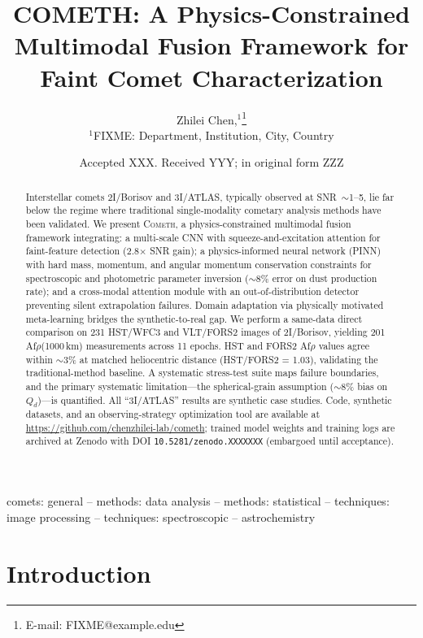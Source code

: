 \documentclass[usenatbib]{mnras}
\begin{document}
\title[COMETH: A Physics-Constrained Multimodal Fusion Framework]{COMETH: A Physics-Constrained Multimodal Fusion Framework for Faint Comet Characterization}

\author[Chen et al.]{
Zhilei Chen,$^{1}$\thanks{E-mail: FIXME@example.edu}
\\
$^{1}$FIXME: Department, Institution, City, Country
}

\date{Accepted XXX. Received YYY; in original form ZZZ}

\begin{abstract}
Interstellar comets 2I/Borisov and 3I/ATLAS, typically observed at SNR~$\sim$1--5, lie far below the regime where traditional single-modality cometary analysis methods have been validated. We present \textsc{Cometh}, a physics-constrained multimodal fusion framework integrating: a multi-scale CNN with squeeze-and-excitation attention for faint-feature detection (2.8$\times$ SNR gain); a physics-informed neural network (PINN) with hard mass, momentum, and angular momentum conservation constraints for spectroscopic and photometric parameter inversion ($\sim$8\% error on dust production rate); and a cross-modal attention module with an out-of-distribution detector preventing silent extrapolation failures. Domain adaptation via physically motivated meta-learning bridges the synthetic-to-real gap. We perform a same-data direct comparison on 231 HST/WFC3 and VLT/FORS2 images of 2I/Borisov, yielding 201 Af$\rho$(1000\,km) measurements across 11 epochs. HST and FORS2 Af$\rho$ values agree within $\sim$3\% at matched heliocentric distance (HST/FORS2 = 1.03), validating the traditional-method baseline. A systematic stress-test suite maps failure boundaries, and the primary systematic limitation---the spherical-grain assumption ($\sim$8\% bias on $Q_d$)---is quantified. All ``3I/ATLAS'' results are synthetic case studies. Code, synthetic datasets, and an observing-strategy optimization tool are available at \url{https://github.com/chenzhilei-lab/cometh}; trained model weights and training logs are archived at Zenodo with DOI \texttt{10.5281/zenodo.XXXXXXX} (embargoed until acceptance).
\end{abstract}

\begin{keywords}
comets: general -- methods: data analysis -- methods: statistical -- techniques: image processing -- techniques: spectroscopic -- astrochemistry
\end{keywords}

\section{Introduction}\label{sec:intro}
\end{document}
